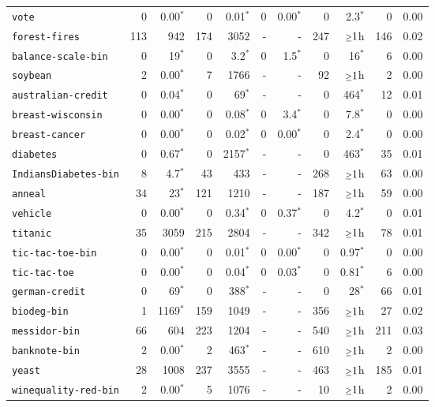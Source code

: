 \begin{tabular}{lrrrrrrrrrr}
\texttt{vote} & 0 & 0.00$^*$ & 0 & 0.01$^*$ & 0 & 0.00$^*$ & 0 & 2.3$^*$ & 0 & 0.00\\
\texttt{forest-fires} & 113 & 942 & 174 & 3052 & - & - & 247 & $\mathsmaller{\geq}1$h & 146 & 0.02\\
\texttt{balance-scale-bin} & 0 & 19$^*$ & 0 & 3.2$^*$ & 0 & 1.5$^*$ & 0 & 16$^*$ & 6 & 0.00\\
\texttt{soybean} & 2 & 0.00$^*$ & 7 & 1766 & - & - & 92 & $\mathsmaller{\geq}1$h & 2 & 0.00\\
\texttt{australian-credit} & 0 & 0.04$^*$ & 0 & 69$^*$ & - & - & 0 & 464$^*$ & 12 & 0.01\\
\texttt{breast-wisconsin} & 0 & 0.00$^*$ & 0 & 0.08$^*$ & 0 & 3.4$^*$ & 0 & 7.8$^*$ & 0 & 0.00\\
\texttt{breast-cancer} & 0 & 0.00$^*$ & 0 & 0.02$^*$ & 0 & 0.00$^*$ & 0 & 2.4$^*$ & 0 & 0.00\\
\texttt{diabetes} & 0 & 0.67$^*$ & 0 & 2157$^*$ & - & - & 0 & 463$^*$ & 35 & 0.01\\
\texttt{IndiansDiabetes-bin} & 8 & 4.7$^*$ & 43 & 433 & - & - & 268 & $\mathsmaller{\geq}1$h & 63 & 0.00\\
\texttt{anneal} & 34 & 23$^*$ & 121 & 1210 & - & - & 187 & $\mathsmaller{\geq}1$h & 59 & 0.00\\
\texttt{vehicle} & 0 & 0.00$^*$ & 0 & 0.34$^*$ & 0 & 0.37$^*$ & 0 & 4.2$^*$ & 0 & 0.01\\
\texttt{titanic} & 35 & 3059 & 215 & 2804 & - & - & 342 & $\mathsmaller{\geq}1$h & 78 & 0.01\\
\texttt{tic-tac-toe-bin} & 0 & 0.00$^*$ & 0 & 0.01$^*$ & 0 & 0.00$^*$ & 0 & 0.97$^*$ & 0 & 0.00\\
\texttt{tic-tac-toe} & 0 & 0.00$^*$ & 0 & 0.04$^*$ & 0 & 0.03$^*$ & 0 & 0.81$^*$ & 6 & 0.00\\
\texttt{german-credit} & 0 & 69$^*$ & 0 & 388$^*$ & - & - & 0 & 28$^*$ & 66 & 0.01\\
\texttt{biodeg-bin} & 1 & 1169$^*$ & 159 & 1049 & - & - & 356 & $\mathsmaller{\geq}1$h & 27 & 0.02\\
\texttt{messidor-bin} & 66 & 604 & 223 & 1204 & - & - & 540 & $\mathsmaller{\geq}1$h & 211 & 0.03\\
\texttt{banknote-bin} & 2 & 0.00$^*$ & 2 & 463$^*$ & - & - & 610 & $\mathsmaller{\geq}1$h & 2 & 0.00\\
\texttt{yeast} & 28 & 1008 & 237 & 3555 & - & - & 463 & $\mathsmaller{\geq}1$h & 185 & 0.01\\
\texttt{winequality-red-bin} & 2 & 0.00$^*$ & 5 & 1076 & - & - & 10 & $\mathsmaller{\geq}1$h & 2 & 0.00\\

\end{tabular}

